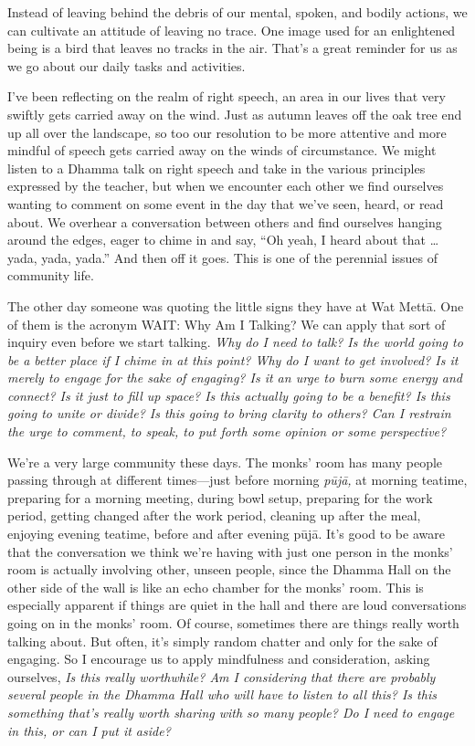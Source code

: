 Instead of leaving behind the debris of our mental, spoken, and bodily 
actions, we can cultivate an attitude of leaving no trace. One image 
used for an enlightened being is a bird that leaves no tracks in the 
air. That's a great reminder for us as we go about our daily tasks and 
activities.


I've been reflecting on the realm of right speech, an area in our lives 
that very swiftly gets carried away on the wind. Just as autumn leaves 
off the oak tree end up all over the landscape, so too our resolution 
to be more attentive and more mindful of speech gets carried away on 
the winds of circumstance. We might listen to a Dhamma talk on right 
speech and take in the various principles expressed by the teacher, but 
when we encounter each other we find ourselves wanting to comment on 
some event in the day that we've seen, heard, or read about. We 
overhear a conversation between others and find ourselves hanging 
around the edges, eager to chime in and say, ``Oh yeah, I heard about 
that \ldots{} yada, yada, yada.'' And then off it goes. This is one of 
the perennial issues of community life.

The other day someone was quoting the little signs they have at Wat 
Mettā. One of them is the acronym WAIT: Why Am I Talking? We can apply 
that sort of inquiry even before we start talking. \emph{Why do I need 
to talk? Is the world going to be a better place if I chime in at this 
point? Why do I want to get involved? Is it merely to engage for the 
sake of engaging? Is it an urge to burn some energy and connect? Is it 
just to fill up space? Is this actually going to be a benefit? Is this 
going to unite or divide? Is this going to bring clarity to others? Can 
I restrain the urge to comment, to speak, to put forth some opinion or 
some perspective?}

We're a very large community these days. The monks' room has many 
people passing through at different times---just before morning 
\emph{pūjā,} at morning teatime, preparing for a morning meeting, 
during bowl setup, preparing for the work period, getting changed after 
the work period, cleaning up after the meal, enjoying evening teatime, 
before and after evening pūjā. It's good to be aware that the 
conversation we think we're having with just one person in the monks' 
room is actually involving other, unseen people, since the Dhamma Hall 
on the other side of the wall is like an echo chamber for the monks' 
room. This is especially apparent if things are quiet in the hall and 
there are loud conversations going on in the monks' room. Of course, 
sometimes there are things really worth talking about. But often, it's 
simply random chatter and only for the sake of engaging. So I encourage 
us to apply mindfulness and consideration, asking ourselves, \emph{Is 
this really worthwhile? Am I considering that there are probably 
several people in the Dhamma Hall who will have to listen to all this? 
Is this something that's really worth sharing with so many people? Do I 
need to engage in this, or can I put it aside?}

